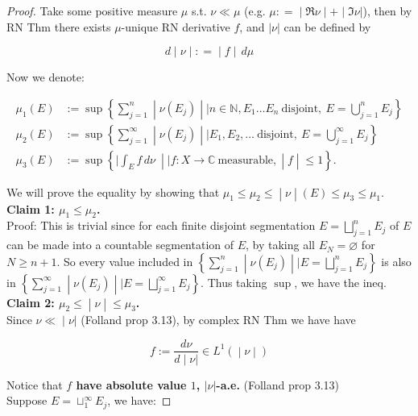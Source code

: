 \documentclass{qlnotes-export}
\begin{document}
\begin{proof}

Take some positive measure \(\mu\) s.t. \(\nu \ll \mu\) (e.g. \(\left. \mu: = \middle| \Re\nu \middle| + \middle| \Im\nu| \right.\)), then by RN Thm there exists \(\mu\)-unique RN derivative \(f\), and \(|\nu|\) can be defined by

\[\left. d \middle| \nu \middle| : = \middle| f \middle| \, d\mu \right.\]

Now we denote:

\[\begin{matrix}
{\mu_{1}(E)} & {:= \sup\left\{ \sum\limits_{j = 1}^{n} \middle| \nu(E_{j}) \middle| \mid n \in {\mathbb{N}},E_{1}\ldots E_{n}\ \text{disjoint},\ E = \bigcup\limits_{j = 1}^{n}E_{j} \right\}} \\
{\mu_{2}(E)} & {:= \sup\left\{ \sum\limits_{j = 1}^{\infty} \middle| \nu(E_{j}) \middle| \mid E_{1},E_{2},\ldots\ \text{disjoint},\ E = \bigcup\limits_{j = 1}^{\infty}E_{j} \right\}} \\
{\mu_{3}(E)} & {:= \sup\left\{ |\int_{E}f\, d\nu\  \middle| \mid f:X\rightarrow{\mathbb{C}}\ \text{measurable}, \middle| f \middle| \leq 1 \right\}.}
\end{matrix}\]

We will prove the equality by showing that \(\left. \mu_{1} \leq \mu_{2} \leq \middle| \nu \middle| (E) \leq \mu_{3} \leq \mu_{1} \right.\).\\
\textbf{Claim 1: \(\mu_{1} \leq \mu_{2}\).}\\
Proof: This is trivial since for each finite disjoint segmentation \(E = \bigsqcup_{j = 1}^{n}E_{j}\) of \(E\) can be made into a countable segmentation of \(E\), by taking all \(E_{N} = \varnothing\) for \(N \geq n + 1\). So every value included in \(\left\{ \sum_{j = 1}^{n} \middle| \nu(E_{j}) \middle| \mid E = \bigsqcup_{j = 1}^{n}E_{j} \right\}\) is also in \(\left\{ \sum_{j = 1}^{\infty} \middle| \nu(E_{j}) \middle| \mid E = \bigsqcup_{j = 1}^{\infty}E_{j} \right\}\). Thus taking \(\sup\), we have the ineq.\\
\textbf{Claim 2: \(\left. \mu_{2} \leq \middle| \nu \middle| \leq \mu_{3} \right.\).}\\
Since \(\left. \nu \ll \middle| \nu| \right.\) (Folland prop 3.13), by complex RN Thm we have have

\[\left. f := \frac{d\nu}{\left. d \middle| \nu| \right.} \in L^{1}( \middle| \nu \middle| ) \right.\]

Notice that \textbf{\(f\) have absolute value \(1\), \(|\nu|\)-a.e.} (Folland prop 3.13)\\
Suppose \(E = \sqcup_{1}^{\infty}E_{j}\), we have:


\end{proof}
\end{document}
